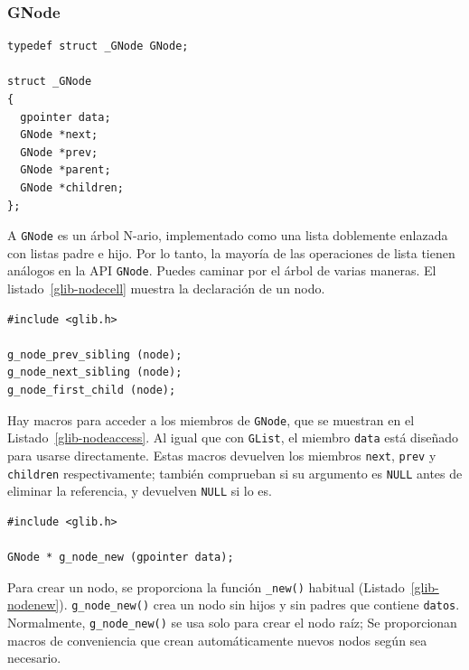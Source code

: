 \subsubsection{GNode}

\begin{lstlisting}[style=GLib/GTK, caption={Celda \lstinline{GNode}}, label=glib-nodecell]
typedef struct _GNode GNode;

struct _GNode
{
  gpointer data;
  GNode *next;
  GNode *prev;
  GNode *parent;
  GNode *children;
};
\end{lstlisting}

A \lstinline{GNode} es un árbol N-ario, implementado como una lista doblemente enlazada con listas padre e hijo. Por lo tanto, la mayoría de las operaciones de lista tienen análogos en la API \lstinline{GNode}. Puedes caminar por el árbol de varias maneras. El listado~\ref{glib-nodecell} muestra la declaración de un nodo.

\begin{lstlisting}[style=GLib/GTK, caption={Accediendo a \lstinline{GNode}}, label=glib-nodeaccess]
#include <glib.h>

g_node_prev_sibling (node);
g_node_next_sibling (node);
g_node_first_child (node);
\end{lstlisting}

Hay macros para acceder a los miembros de \lstinline{GNode}, que se muestran en el Listado~\ref{glib-nodeaccess}. Al igual que con \lstinline{GList}, el miembro \lstinline{data} está diseñado para usarse directamente. Estas macros devuelven los miembros \lstinline{next}, \lstinline{prev} y \lstinline{children} respectivamente; también comprueban si su argumento es \lstinline{NULL} antes de eliminar la referencia, y devuelven \lstinline{NULL} si lo es.

\begin{lstlisting}[style=GLib/GTK, caption={Creando un \lstinline{GNode}}, label=glib-nodenew]
#include <glib.h>

GNode * g_node_new (gpointer data);
\end{lstlisting}

Para crear un nodo, se proporciona la función \lstinline{_new()} habitual (Listado~\ref{glib-nodenew}). \lstinline{g_node_new()} crea un nodo sin hijos y sin padres que contiene \lstinline{datos}. Normalmente, \lstinline{g_node_new()} se usa solo para crear el nodo raíz; Se proporcionan macros de conveniencia que crean automáticamente nuevos nodos según sea necesario.

